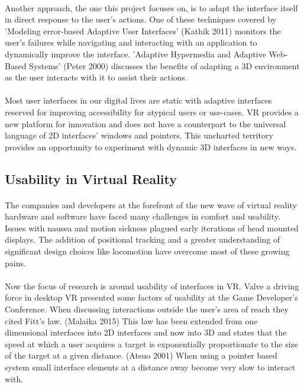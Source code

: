 \documentclass[11pt]{article}
\begin{document}
\paragraph{} 
Another approach, the one this project focuses on, is to adapt the interface itself in direct response to the user's actions. One of these techniques covered by 'Modeling error-based Adaptive User Interfaces' (Kathik 2011) monitors the user's failures while navigating and interacting with an application to dynamically improve the interface. 'Adaptive Hypermedia and Adaptive Web-Based Systems' (Peter 2000) discusses the benefits of adapting a 3D environment as the user interacts with it to assist their actions.

\paragraph{} 
Most user interfaces in our digital lives are static with adaptive interfaces reserved for improving accessibility for atypical users or use-cases. VR provides a new platform for innovation and does not have a counterpart to the universal language of 2D interfaces' windows and pointers. This uncharted territory provides an opportunity to experiment with dynamic 3D interfaces in new ways.

\subsection{Usability in Virtual Reality}

\paragraph{}
The companies and developers at the forefront of the new wave of virtual reality hardware and software have faced many challenges in comfort and usability. Issues with nausea and motion sickness plagued early iterations of head mounted displays. The addition of positional tracking and a greater understanding of significant design choices like locomotion have overcome most of these growing pains.

\paragraph{} 
Now the focus of research is around usability of interfaces in VR. Valve a driving force in desktop VR presented some factors of usability at the Game Developer's Conference. When discussing interactions outside the user's area of reach they cited Fitt's law. (Malaika 2015) This law has been extended from one dimensional interfaces into 2D interfaces and now into 3D and states that the speed at which a user acquires a target is exponentially proportionate to the size of the target at a given distance. (Atsuo 2001) When using a pointer based system small interface elements at a distance away become very slow to interact with.
\end{document}
